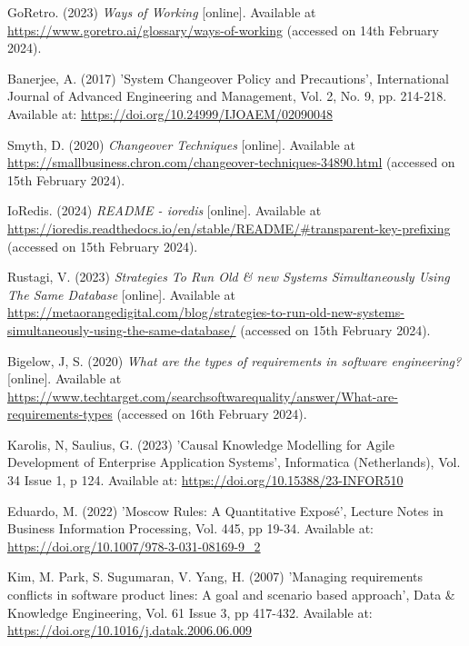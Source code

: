 \noindent GoRetro. (2023) \textit{Ways of Working} [online]. Available at \url{https://www.goretro.ai/glossary/ways-of-working} (accessed on 14th February 2024).
\vspace{0.2cm}

\noindent Banerjee, A. (2017) 'System Changeover Policy and Precautions', International Journal of Advanced Engineering and Management, Vol. 2, No. 9, pp. 214-218. Available at: \url{https://doi.org/10.24999/IJOAEM/02090048}
\vspace{0.2cm}

\noindent Smyth, D. (2020) \textit{Changeover Techniques} [online]. Available at \url{https://smallbusiness.chron.com/changeover-techniques-34890.html} (accessed on 15th February 2024).
\vspace{0.2cm}

\noindent IoRedis. (2024) \textit{README - ioredis} [online]. Available at \url{https://ioredis.readthedocs.io/en/stable/README/#transparent-key-prefixing} (accessed on 15th February 2024).
\vspace{0.2cm}

\noindent Rustagi, V. (2023) \textit{Strategies To Run Old \& new Systems Simultaneously Using The Same Database} [online]. Available at \url{https://metaorangedigital.com/blog/strategies-to-run-old-new-systems-simultaneously-using-the-same-database/} (accessed on 15th February 2024).
\vspace{0.2cm}

\noindent Bigelow, J, S. (2020) \textit{What are the types of requirements in software engineering?} [online]. Available at \url{https://www.techtarget.com/searchsoftwarequality/answer/What-are-requirements-types} (accessed on 16th February 2024).
\vspace{0.2cm}

\noindent Karolis, N, Saulius, G. (2023) 'Causal Knowledge Modelling for Agile Development of Enterprise Application Systems', Informatica (Netherlands), Vol. 34 Issue 1, p 124. Available at: \url{https://doi.org/10.15388/23-INFOR510}
\vspace{0.2cm}

\noindent Eduardo, M. (2022) 'Moscow Rules: A Quantitative Exposé', Lecture Notes in Business Information Processing, Vol. 445, pp 19-34. Available at: \url{https://doi.org/10.1007/978-3-031-08169-9_2}
\vspace{0.2cm}

\noindent Kim, M. Park, S. Sugumaran, V. Yang, H. (2007) 'Managing requirements conflicts in software product lines: A goal and scenario based approach', Data \& Knowledge Engineering, Vol. 61 Issue 3, pp 417-432. Available at: \url{https://doi.org/10.1016/j.datak.2006.06.009}
\vspace{0.2cm}

